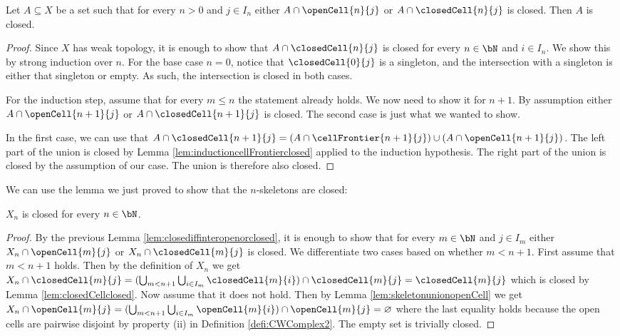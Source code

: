 \begin{lem}\label{lem:closediffinteropenorclosed}
    Let $A \subseteq X$ be a set such that for every $n > 0$ and $j \in I_n$ either $A \cap \openCell{n}{j}$ or $A \cap \closedCell{n}{j}$ is closed.
    Then $A$ is closed.
    \href{https://github.com/scholzhannah/CWComplexes/blob/7be4872a05b534011cc969eb5b80a4b7f0bf57e2/CWcomplexes/Definition.lean#L403-L418}{\faExternalLink}
\end{lem}
\begin{proof}
    Since $X$ has weak topology, it is enough to show that $A \cap \closedCell{n}{j}$ is closed for every $n \in \bN$ and $i \in I_n$.
    We show this by strong induction over $n$.
    For the base case $n = 0$, notice that $\closedCell{0}{j}$ is a singleton, and the intersection with a singleton is either that singleton or empty.
    As such, the intersection is closed in both cases.

    For the induction step, assume that for every $m \le n$ the statement already holds.
    We now need to show it for $n + 1$.
    By assumption either $A \cap \openCell{n + 1}{j}$ or $A \cap \closedCell{n + 1}{j}$ is closed. 
    The second case is just what we wanted to show.

    In the first case, we can use that $A \cap \closedCell{n + 1}{j} = (A \cap \cellFrontier{n + 1}{j}) \cup (A \cap \openCell{n + 1}{j})$.
    The left part of the union is closed by Lemma \ref{lem:inductioncellFrontierclosed} applied to the induction hypothesis.
    The right part of the union is closed by the assumption of our case.
    The union is therefore also closed.
\end{proof}

We can use the lemma we just proved to show that the $n$-skeletons are closed:

\begin{lem}\label{lem:levelclosed}
    $X_n$ is closed for every $n \in \bN$. \href{https://github.com/scholzhannah/CWComplexes/blob/7be4872a05b534011cc969eb5b80a4b7f0bf57e2/CWcomplexes/Lemmas.lean#L27}{\faExternalLink}
\end{lem}
\begin{proof}
    By the previous Lemma \ref{lem:closediffinteropenorclosed}, it is enough to show that for every $m \in \bN$ and $j \in I_m$ either $X_n \cap \openCell{m}{j}$ or $X_n \cap \closedCell{m}{j}$ is closed.
    We differentiate two cases based on whether $m < n + 1$.
    First assume that $m < n + 1$ holds.
    Then by the definition of $X_n$ we get $X_n \cap \closedCell{m}{j} = (\bigcup_{m < n + 1} \bigcup_{i \in I_m} \closedCell{m}{i}) \cap \closedCell{m}{j} = \closedCell{m}{j}$ which is closed by Lemma \ref{lem:closedCellclosed}.
    Now assume that it does not hold.
    Then by Lemma \ref{lem:skeletonunionopenCell} we get $X_n \cap \openCell{m}{j} = (\bigcup_{m < n + 1} \bigcup_{i \in I_m} \openCell{m}{i}) \cap \openCell{m}{j} = \varnothing$ where the last equality holds because the open cells are pairwise disjoint by property (ii) in Definition \ref{defi:CWComplex2}.
    The empty set is trivially closed.
\end{proof}

